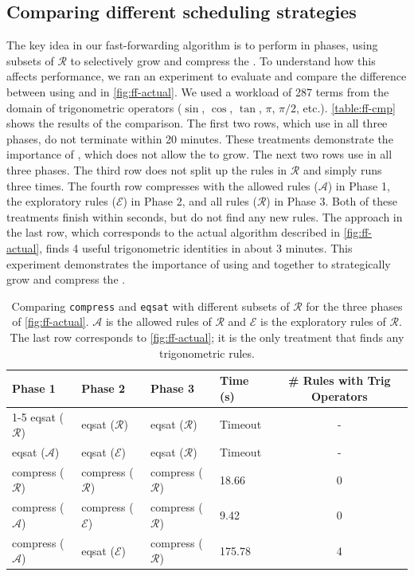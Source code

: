 \subsection{Comparing different scheduling strategies}
\label{subsec:cmp}
The key idea in our fast-forwarding algorithm is to
  perform \eqsat in phases,
  using subsets of $\mathcal{R}$ to selectively
  grow and compress the \egraph.
To understand how this affects performance,
  we ran an experiment to evaluate and compare
  the difference between using
   and 
  in \autoref{fig:ff-actual}.
We used a workload of 287 terms
  from the domain of trigonometric operators
  ($\sin$, $\cos$, $\tan$, $\pi$, $\pi/2$, etc.).
\autoref{table:ff-cmp} shows the
  results of the comparison.
The first two rows, which use  in all three phases, do not terminate
  within 20 minutes.
These treatments demonstrate the importance of , which does not
  allow the \egraph to grow.
The next two rows use  in all three phases.
The third row does not split up the rules in $\mathcal{R}$ and simply runs
   three times.
The fourth row compresses with the allowed rules ($\mathcal{A}$) in
  Phase 1, the exploratory rules ($\mathcal{E}$)
  in Phase 2, and all rules ($\mathcal{R}$) in Phase 3.
Both of these treatments finish within seconds, but do not find any new rules.
The approach in the last row, which corresponds to the actual \ff algorithm
  described in \autoref{fig:ff-actual}, finds 4 useful trigonometric
  identities in about 3 minutes.
This experiment demonstrates the importance of using  and 
  together to strategically grow and compress the \egraph.

\begin{table}[h]
  \footnotesize
\begin{tabular}{llllc}
  Phase 1 & Phase 2 & Phase 3 & Time (s) & \# Rules with Trig Operators \\ \cline{1-5}
eqsat ($\mathcal{R}$) & eqsat ($\mathcal{R}$) & eqsat ($\mathcal{R}$) & Timeout & - \\
eqsat ($\mathcal{A}$) & eqsat ($\mathcal{E}$) & eqsat ($\mathcal{R}$) & Timeout & - \\
compress ($\mathcal{R}$) & compress ($\mathcal{R}$) & compress ($\mathcal{R}$) & 18.66 & 0 \\
compress ($\mathcal{A}$) & compress ($\mathcal{E}$) & compress ($\mathcal{R}$) & 9.42 & 0 \\
compress ($\mathcal{A}$) & eqsat ($\mathcal{E}$) & compress ($\mathcal{R}$) & 175.78 & 4 \\
\end{tabular}%
\caption{Comparing \texttt{compress} and \texttt{eqsat} with different
    subsets of $\mathcal{R}$ for the three phases of \autoref{fig:ff-actual}.
    $\mathcal{A}$ is the allowed rules of $\mathcal{R}$ and
    $\mathcal{E}$ is the exploratory rules of $\mathcal{R}$.
    The last row corresponds to \autoref{fig:ff-actual};
    it is the only treatment that finds any trigonometric rules.}
\label{table:ff-cmp}
\end{table}

